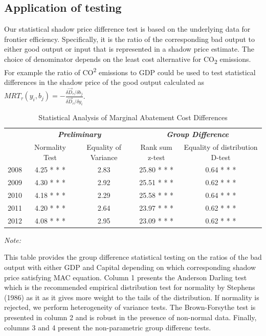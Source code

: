 \documentclass[
  10pt,
]{article}
\begin{document}
\hypertarget{application-of-testing}{%
\subsection{Application of testing}\label{application-of-testing}}

Our statistical shadow price difference test is based on the underlying
data for frontier efficiency. Specifically, it is the ratio of the
corresponding bad output to either good output or input that is
represented in a shadow price estimate.  The choice of denominator depends on the least cost alternative for CO\textsubscript{2} emissions. For example the ratio of
CO\textsuperscript{2} emissions to GDP could be used to test statistical
differences in the shadow price of the good output calculated as
\(MRT_{\tau}(y_{i},b_{j})=-\frac{\delta \vec{D}_{\tau}/\delta b_{j}}{\delta \vec{D}_{\tau}/\delta y_{i}}\).

\begin{table}[H]

\caption{\label{tab:Test1}Statistical Analysis of Marginal Abatement Cost Differences}
\centering
\begin{threeparttable}
\begin{tabular}[t]{lcccc}
\toprule
\multicolumn{1}{c}{\em{\textbf{}}} & \multicolumn{2}{c}{\em{\textbf{Preliminary}}} & \multicolumn{2}{c}{\em{\textbf{Group Difference }}} \\
\cmidrule(l{3pt}r{3pt}){2-3} \cmidrule(l{3pt}r{3pt}){4-5}
  & Normality Test & Equality of Variance & Rank sum z-test & Equality of distribution D-test\\
\midrule
2008 & 4.25 * * * & 2.83 & 25.80 * * * & 0.64 * * *\\
2009 & 4.30 * * * & 2.92 & 25.51 * * * & 0.62 * * *\\
2010 & 4.18 * * * & 2.29 & 25.58 * * * & 0.64 * * *\\
2011 & 4.20 * * * & 2.64 & 23.97 * * * & 0.62 * * *\\
2012 & 4.08 * * * & 2.95 & 23.09 * * * & 0.62 * * *\\
\bottomrule
\end{tabular}
\begin{tablenotes}
\item \textit{Note: } 
\item This table provides the group difference statistical testing on the ratios of the bad output with either GDP and Capital depending on which corresponding shadow price satisfying MAC equation. Column 1 presents the Anderson Darling test which is the recommended empirical distribution test for normality by Stephens (1986) as it as it gives more weight to the tails of the distribution.  If normality is rejected, we perform heterogeneity of variance tests. The Brown-Forsythe test is presented in column 2 and is robust in the presence of non-normal data. Finally, columns 3 and 4 present the non-parametric group differenc tests.
\end{tablenotes}
\end{threeparttable}
\end{table}
\end{document}
